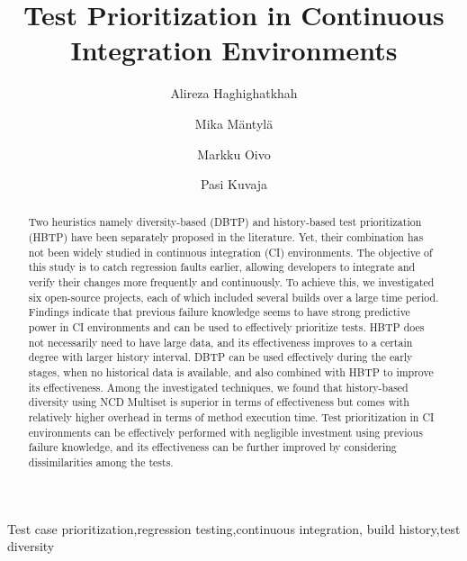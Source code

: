 \documentclass[1p]{elsarticle}
\begin{document}
\begin{frontmatter}

\title{Test Prioritization in Continuous Integration Environments}

\address[label1]{Empirical Software Engineering in Software, Systems and Services (M3S), Faculty of Information Technology and Electrical Engineering (ITEE), University of Oulu, Oulu, Finland.}

\author[label1]{Alireza Haghighatkhah}
\author[label1]{Mika M\"{a}ntyl\"{a}}
\author[label1]{Markku Oivo}
\author[label1]{Pasi Kuvaja}

\begin{abstract}
Two heuristics namely diversity-based (DBTP) and history-based test prioritization (HBTP) have been separately proposed in the literature. Yet, their combination has not been widely studied in continuous integration (CI) environments. The objective of this study is to catch regression faults earlier, allowing developers to integrate and verify their changes more frequently and continuously. To achieve this, we investigated six open-source projects, each of which included several builds over a large time period. Findings indicate that previous failure knowledge seems to have strong predictive power in CI environments and can be used to effectively prioritize tests. HBTP does not necessarily need to have large data, and its effectiveness improves to a certain degree with larger history interval. DBTP can be used effectively during the early stages, when no historical data is available, and also combined with HBTP to improve its effectiveness. Among the investigated techniques, we found that history-based diversity using NCD Multiset is superior in terms of effectiveness but comes with relatively higher overhead in terms of method execution time. Test prioritization in CI environments can be effectively performed with negligible investment using previous failure knowledge, and its effectiveness can be further improved by considering dissimilarities among the tests.
\end{abstract}

\begin{keyword}
Test case prioritization\sep regression testing\sep continuous integration\sep
build history\sep test diversity
\end{keyword}

\end{frontmatter}
\end{document}
